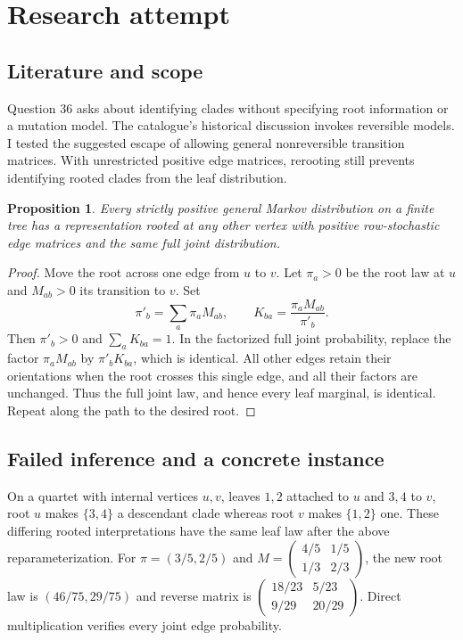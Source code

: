 \documentclass[11pt]{article}
\newtheorem{proposition}{Proposition}
\begin{document}
\section{Research attempt}
\subsection{Literature and scope}
Question 36 asks about identifying clades without specifying root information or a mutation model. The catalogue's historical discussion invokes reversible models. I tested the suggested escape of allowing general nonreversible transition matrices. With unrestricted positive edge matrices, rerooting still prevents identifying rooted clades from the leaf distribution.
\begin{proposition}
Every strictly positive general Markov distribution on a finite tree has a representation rooted at any other vertex with positive row-stochastic edge matrices and the same full joint distribution.
\end{proposition}
\begin{proof}
Move the root across one edge from $u$ to $v$. Let $\pi_a>0$ be the root law at $u$ and $M_{ab}>0$ its transition to $v$. Set
\[
\pi'_b=\sum_a\pi_aM_{ab},\qquad K_{ba}=\frac{\pi_aM_{ab}}{\pi'_b}.
\]
Then $\pi'_b>0$ and $\sum_aK_{ba}=1$. In the factorized full joint probability, replace the factor $\pi_aM_{ab}$ by $\pi'_bK_{ba}$, which is identical. All other edges retain their orientations when the root crosses this single edge, and all their factors are unchanged. Thus the full joint law, and hence every leaf marginal, is identical. Repeat along the path to the desired root.
\end{proof}
\subsection{Failed inference and a concrete instance}
On a quartet with internal vertices $u,v$, leaves $1,2$ attached to $u$ and $3,4$ to $v$, root $u$ makes $\{3,4\}$ a descendant clade whereas root $v$ makes $\{1,2\}$ one. These differing rooted interpretations have the same leaf law after the above reparameterization. For $\pi=(3/5,2/5)$ and $M=\left(\begin{smallmatrix}4/5&1/5\\1/3&2/3\end{smallmatrix}\right)$, the new root law is $(46/75,29/75)$ and reverse matrix is $\left(\begin{smallmatrix}18/23&5/23\\9/29&20/29\end{smallmatrix}\right)$. Direct multiplication verifies every joint edge probability.
\end{document}
